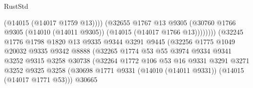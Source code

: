 \begin{lexlean}{RustStd}
\begin{coremodule}
                                              (@14015 (@14017 @1759 @13))))
                                          (@32655
                                            @1767
                                            @13
                                            @9305
                                            (@30760
                                              @1766
                                              @9305
                                              (@14010 (@14011 @9305))
                                              (@14015 (@14017 @1766 @13))))))))
                                  (@32245
                                    @1776
                                    @1798
                                    @1820
                                    @13
                                    @9335
                                    @9344
                                    @3291
                                    @9445
                                    (@32256
                                      @1775
                                      @1049
                                      @20032
                                      @9335
                                      @9342
                                      @8888
                                      (@32265
                                        @1774
                                        @53
                                        @55
                                        @3974
                                        @9334
                                        @9341
                                        @3252
                                        @9315
                                        @3258
                                        @30738
                                        (@32264
                                          @1772
                                          @106
                                          @53
                                          @16
                                          @9331
                                          @3291
                                          @3271
                                          @3252
                                          @9325
                                          @3258
                                          (@30698
                                            @1771
                                            @9331
                                            (@14010 (@14011 @9331))
                                            (@14015 (@14017 @1771 @53)))
                                          @30665

\end{coremodule}
\end{lexlean}
